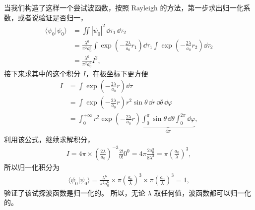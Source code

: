 当我们构造了这样一个尝试波函数，按照 Rayleigh 的方法，第一步求出归一化系数，或者说验证是否归一，
\begin{align}
    \langle \psi_0 | \psi_0 \rangle &= \iint |\psi_0|^2 \,\dd\tau_1\,\dd\tau_2 \\
    &= \frac{\lambda^6}{\pi^2a_0^6} 
    \int \exp\!\left(-\frac{2\lambda}{a_0}r_1\right)\dd\tau_1 
    \int \exp\!\left(-\frac{2\lambda}{a_0}r_2\right)\dd\tau_2 
    \\
    &= \frac{\lambda^6}{\pi^2a_0^6} I^2,
\end{align}
接下来求其中的这个积分 $I$，在极坐标下更方便
\begin{align}
    I &= \int \exp\left(- \frac{2\lambda}{a_0} r\right) \dd\tau \\
    &= \int \exp\left(- \frac{2\lambda}{a_0} r\right) r^2 \sin\theta\,\dd r\,\dd\theta\,\dd\varphi \\
    &= \int_0^{+\infty} r^2 \exp\left(- \frac{2\lambda}{a_0} r\right) 
    \underbrace{\int_0^\pi \sin\theta\,\dd\theta \int_0^{2\pi} \dd\varphi}_{4\pi},
\end{align}
利用该公式，继续求解积分，
\begin{align}
    I = 4\pi \times \left(\frac{2\lambda}{a_0}\right)^{-3} \frac{2!}{0!} 0^0 = 4\pi \frac{2a_0^3}{8\lambda^3} = \pi\left(\frac{a_0}{\lambda}\right)^3,
\end{align}
所以归一化积分为
\begin{align}
    \langle \psi_0 | \psi_0 \rangle = \frac{\lambda^6}{\pi^2a_0^6} \times \pi\left(\frac{a_0}{\lambda}\right)^3 \times \pi\left(\frac{a_0}{\lambda}\right)^3 = 1,
\end{align}
验证了该试探波函数是归一化的。
所以，无论 $\lambda$ 取任何值，波函数都可以归一化的。

